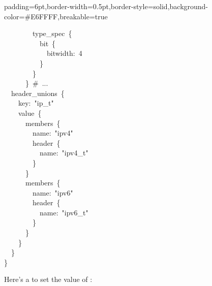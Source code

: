 \documentclass[11pt]{article}
\begin{document}
{\begin{mdbmargintb}{6pt}{6pt}
\begin{mdblock}{padding=6pt,border-width=0.5pt,border-style=solid,background-color=\#E6FFFF,breakable=true}
\begin{mdpre}
{{~~~~~~~~type\_spec~\{\\
~~~~~~~~~~bit~\{\\
~~~~~~~~~~~~bitwidth:~{4}\\
~~~~~~~~~~\}\\
~~~~~~~~\}\\
~~~~~~\}~{\#~...}\\
~~header\_unions~\{\\
~~~~key:~{"}{ip\_t}{"}\\
~~~~value~\{\\
~~~~~~members~\{\\
~~~~~~~~name:~{"}{ipv4}{"}\\
~~~~~~~~header~\{\\
~~~~~~~~~~name:~{"}{ipv4\_t}{"}\\
~~~~~~~~\}\\
~~~~~~\}\\
~~~~~~members~\{\\
~~~~~~~~name:~{"}{ipv6}{"}\\
~~~~~~~~header~\{\\
~~~~~~~~~~name:~{"}{ipv6\_t}{"}\\
~~~~~~~~\}\\
~~~~~~\}\\
~~~~\}\\
~~\}\\
\}}}%
\end{mdpre}%
\end{mdblock}%
\end{mdbmargintb}%

\noindent{}Here's a  to set the value of :%

}
\end{document}
